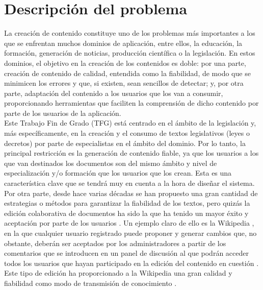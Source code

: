 \section{Descripción del problema}
La creación de contenido constituye uno de los problemas más importantes a los que se enfrentan muchos dominios de aplicación, entre ellos, la educación, la formación, generación de noticias, producción científica o la legislación. En estos dominios, el objetivo en la creación de los contenidos es doble: por una parte, creación de contenido de calidad, entendida como la fiabilidad, de modo que se minimicen los errores y que, si existen, sean sencillos de detectar; y, por otra parte, adaptación del contenido a los usuarios que los van a consumir, proporcionando herramientas que faciliten la comprensión de dicho contenido por parte de los usuarios de la aplicación.
\\

Este Trabajo Fin de Grado (TFG) está centrado en el ámbito de la legislación y, más específicamente, en la creación y el consumo de textos legislativos (leyes o decretos) por parte de especialistas en el ámbito del dominio. Por lo tanto, la principal restricción es la generación de contenido fiable, ya que los usuarios a los que van destinados los documentos son del mismo ámbito y nivel de especialización y/o formación que los usuarios que los crean. Esta es una característica clave que se tendrá muy en cuenta a la hora de diseñar el sistema.
\\

Por otra parte, desde hace varias décadas se han propuesto una gran cantidad de estrategias o métodos para garantizar la fiabilidad de los textos, pero quizás la edición colaborativa de documentos ha sido la que ha tenido un mayor éxito y aceptación por parte de los usuarios \cite{collaborative}. Un ejemplo claro de ello es la Wikipedia \cite{wikipedia}, en la que cualquier usuario registrado puede proponer y generar cambios que, no obstante, deberán ser aceptados por los administradores a partir de los comentarios que se introducen en un panel de discusión al que podrán acceder todos los usuarios que hayan participado en la edición del contenido en cuestión \cite{knowledge}. Este tipo de edición ha proporcionado a la Wikipedia una gran calidad y fiabilidad como modo de transmisión de conocimiento \cite{trustworthiness}.
\\

